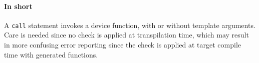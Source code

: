 \paragraph*{In short}

A \texttt{call} statement invokes a device function, with or without template arguments. Care is needed since no check is applied at transpilation time, which may result in more confusing error reporting since the check is applied at target compile time with generated functions.
